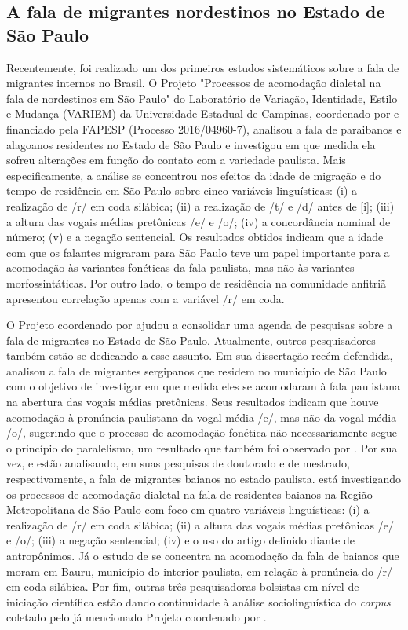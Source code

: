 \documentclass[
    a4paper,	%
    12pt,	%
    ]{article}	%
\begin{document}
	\subsection{A fala de migrantes nordestinos no Estado de São Paulo}
	\label{estudos-sp}

Recentemente, foi realizado um dos primeiros estudos sistemáticos sobre a fala
de migrantes internos no Brasil. O Projeto "Processos de acomodação dialetal na
fala de nordestinos em São Paulo" do Laboratório de Variação, Identidade, Estilo
e Mudança (VARIEM) da Universidade Estadual de Campinas, coordenado por
\citet{Oushiro2018} e financiado pela FAPESP (Processo 2016/04960-7), analisou a
fala de paraibanos e alagoanos residentes no Estado de São Paulo e investigou em
que medida ela sofreu alterações em função do contato com a variedade paulista.
Mais especificamente, a análise se concentrou nos efeitos da idade de migração e
do tempo de residência em São Paulo sobre cinco variáveis linguísticas: (i) a
realização de /r/ em coda silábica; (ii) a realização de /t/ e /d/ antes de [i];
(iii) a altura das vogais médias pretônicas /e/ e /o/; (iv) a concordância
nominal de número; (v) e a negação sentencial. Os resultados obtidos indicam que
a idade com que os falantes migraram para São Paulo teve um papel importante
para a acomodação às variantes fonéticas da fala paulista, mas não às variantes
morfossintáticas. Por outro lado, o tempo de residência na comunidade anfitriã
apresentou correlação apenas com a variável /r/ em coda.

O Projeto coordenado por \citet{Oushiro2018} ajudou a consolidar uma agenda de
pesquisas sobre a fala de migrantes no Estado de São Paulo. Atualmente, outros
pesquisadores também estão se dedicando a esse assunto. Em sua dissertação
recém-defendida, \citet{Santana2019} analisou a fala de migrantes sergipanos que
residem no município de São Paulo com o objetivo de investigar em que medida
eles se acomodaram à fala paulistana na abertura das vogais médias pretônicas.
Seus resultados indicam que houve acomodação à pronúncia paulistana da vogal
média /e/, mas não da vogal média /o/, sugerindo que o processo de acomodação
fonética não necessariamente segue o princípio do paralelismo, um resultado que
também foi observado por \citet{Oushiro2019}. Por sua vez, \citet{Souza2017} e
\citet{Oliveira2019} estão analisando, em suas pesquisas de doutorado e de
mestrado, respectivamente, a fala de migrantes baianos no estado paulista.
\citet{Souza2017} está investigando os processos de acomodação dialetal na fala
de residentes baianos na Região Metropolitana de São Paulo com foco em quatro
variáveis linguísticas: (i) a realização de /r/ em coda silábica; (ii) a altura
das vogais médias pretônicas /e/ e /o/; (iii) a negação sentencial; (iv) e o uso
do artigo definido diante de antropônimos. Já o estudo de \citet{Oliveira2019}
se concentra na acomodação da fala de baianos que moram em Bauru, município do
interior paulista, em relação à pronúncia do /r/ em coda silábica. Por fim,
outras três pesquisadoras bolsistas em nível de iniciação científica estão dando
continuidade à análise sociolinguística do \emph{corpus} coletado pelo já
mencionado Projeto coordenado por \citet{Oushiro2018}.
\end{document}
